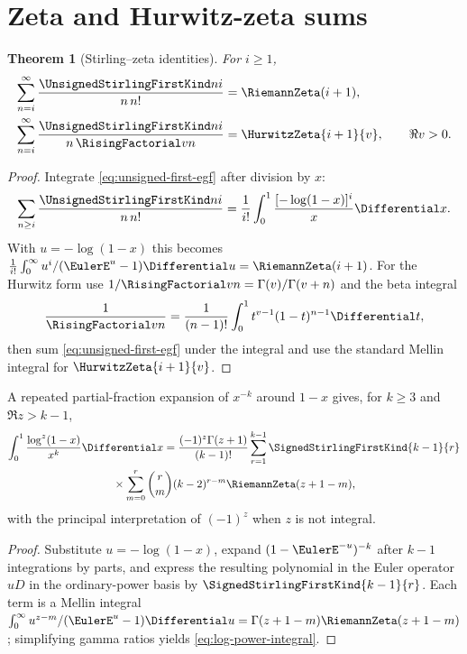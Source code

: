 \documentclass[11pt,a4paper,oneside,openany]{book}
\newtheorem{theorem}{Theorem}[chapter]
\theoremstyle{definition}
\theoremstyle{remark}
\begin{document}
\section{Zeta and Hurwitz-zeta sums}
\begin{theorem}[Stirling--zeta identities]\label{thm:stirling-zeta}
For $i\ge1$,
\begin{align}
 \sum_{n=i}^\infty\frac{\UnsignedStirlingFirstKind ni}{n\,n!}&=\RiemannZeta(i+1),
 \label{eq:first-zeta}\\
 \sum_{n=i}^\infty\frac{\UnsignedStirlingFirstKind ni}{n\,\RisingFactorial v n}&=\HurwitzZeta{i+1}{v},
 \qquad \Re v>0.\label{eq:first-hurwitz}
\end{align}
\end{theorem}
\begin{proof}
Integrate \cref{eq:unsigned-first-egf} after division by $x$:
\[
 \sum_{n\ge i}\frac{\UnsignedStirlingFirstKind ni}{n\,n!}
 =\frac1{i!}\int_0^1\frac{[-\log(1-x)]^i}{x}\Differential x.
\]
With $u=-\log(1-x)$ this becomes
$\frac1{i!}\int_0^\infty u^i/(\EulerE^u-1)\Differential u=\RiemannZeta(i+1)$.
For the Hurwitz form use
$1/\RisingFactorial v n=\Gamma(v)/\Gamma(v+n)$ and the beta integral
\[
 \frac1{\RisingFactorial v n}=\frac1{(n-1)!}\int_0^1t^{v-1}(1-t)^{n-1}\Differential t,
\]
then sum \cref{eq:unsigned-first-egf} under the integral and use the standard
Mellin integral for $\HurwitzZeta{i+1}{v}$.
\end{proof}

A repeated partial-fraction expansion of $x^{-k}$ around $1-x$ gives, for
$k\ge3$ and $\Re z>k-1$,
\begin{multline}\label{eq:log-power-integral}
 \int_0^1\frac{\log^z(1-x)}{x^k}\Differential x
 =\frac{(-1)^z\Gamma(z+1)}{(k-1)!}
 \sum_{r=1}^{k-1}\SignedStirlingFirstKind{k-1}{r}\\
 {}\times\sum_{m=0}^r\binom rm(k-2)^{r-m}\RiemannZeta(z+1-m),
\end{multline}
with the principal interpretation of $(-1)^z$ when $z$ is not integral.
\begin{proof}
Substitute $u=-\log(1-x)$, expand
$(1-\EulerE^{-u})^{-k}$ after $k-1$ integrations by parts, and express the resulting
polynomial in the Euler operator $uD$ in the ordinary-power basis by
$\SignedStirlingFirstKind{k-1}{r}$.  Each term is a Mellin integral
$\int_0^\infty u^{z-m}/(\EulerE^u-1)\Differential u=\Gamma(z+1-m)\RiemannZeta(z+1-m)$; simplifying gamma
ratios yields \cref{eq:log-power-integral}.
\end{proof}
\end{document}
